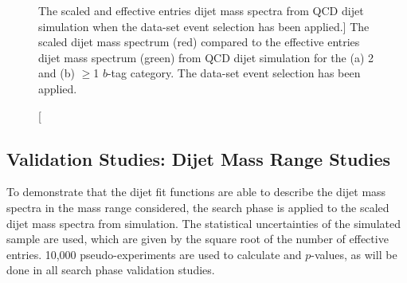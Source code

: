 \begin{figure}[!ht]
  \begin{center}
    \captionsetup[subfigure]{aboveskip=0pt,justification=centering}
   \hspace{-2mm}
  \end{center}
  \vspace{-0.8em}
  \caption
      [The scaled and effective entries dijet mass spectra
        from QCD dijet simulation when the \summer{} data-set event selection has been applied.]
      {The scaled dijet mass spectrum (red) compared to the
        effective entries dijet mass spectrum (green)
        from QCD dijet simulation for the (a) 2 and (b) $\geq$1 $b$-tag category.
        The \summer{} data-set event selection has been applied.}
  \label{fig:effEnt}
\end{figure}

\subsection{Validation Studies: Dijet Mass Range Studies}
\label{sec:bkg-summer_range}

To demonstrate that the dijet fit functions are able to describe the dijet mass spectra in the mass range considered,
the search phase is applied to the scaled dijet mass spectra from simulation.
The statistical uncertainties of the simulated sample are used,
which are given by the square root of the number of effective entries.
10,000 pseudo-experiments are used to calculate \bh{} and \dhunt{} $p$-values, as will be done in all \summer{} search phase validation studies.

